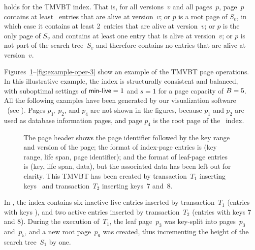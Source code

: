 \thmskip
\begin{invariant}
\label{inv:tmvbt-live-count}
 holds for the TMVBT index.
That is, for all versions~$v$ and all pages~$p$, page~$p$ contains at least
\minlive\ entries that are alive at version~$v$; or $p$ is a root page of
$S_v$, in which case it contains at least \num{2}~entries that are alive at
version~$v$; or $p$ is the only page of $S_v$ and contains at least one entry
that is alive at version~$v$; or $p$ is not part of the search tree~$S_v$ and
therefore contains no entries that are alive at version~$v$.
\end{invariant}
\thmskip

Figures~\ref{fig:example-oper-1}--\ref{fig:example-oper-3} show
an example of the TMVBT page operations. 
In this illustrative example, the index is structurally consistent and
balanced, with suboptimal settings of $\text{\textsf{min-live}} = 1$ and $s = 1$ for a page
capacity of $B = 5$. 
All the following examples have been generated by our visualization
software \TreeLib\ (see ). 
Pages $p_1$, $p_2$, and $p_4$ are not shown in the figures, because  
$p_1$ and $p_2$ are used as database information pages, and page
$p_4$ is the root page of the \rootstar\ index. 

\begin{figure}[!hbt]
\begin{center}
  
  {
  The page header shows the page identifier followed by the key range
  and version of the page; 
  the format of index-page entries is (key range, life span, page
  identifier); and 
  the format of leaf-page entries is (key, life span, data), but
  the associated data has been left out for clarity. 
  This TMVBT has been created by transaction~$T_1$
  inserting keys~ and transaction~$T_2$ inserting
  keys~\num{7} and~\num{8}.
  }
  \label{fig:example-oper-1}
\end{center}
\end{figure}

In , the index contains six inactive live
entries inserted by transaction~$T_1$ (entries with keys ), and
two active entries inserted by transaction~$T_2$ (entries with keys \num{7}
and \num{8}). 
During the execution of~$T_1$, the leaf page~$p_3$ was key-split into
pages~$p_3$ and~$p_5$, and a new root page~$p_6$ was created, thus
incrementing the height of the search tree~$S_1$ by one.

